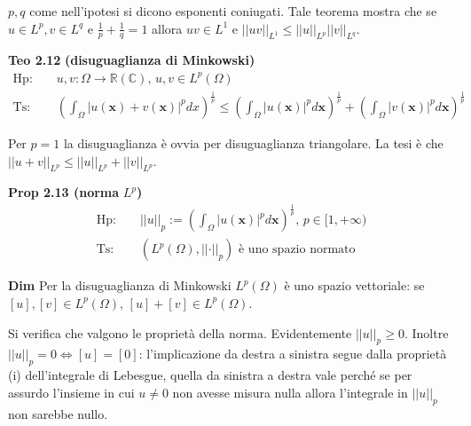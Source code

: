 \documentclass{article}
\begin{document}
$p,q$ come nell'ipotesi si dicono esponenti coniugati. Tale teorema mostra
che se $u\in L^{p},v\in L^{q}$ e $\frac{1}{p}+\frac{1}{q}=1$ allora $uv\in
L^{1}$ e $\left\vert \left\vert uv\right\vert \right\vert _{L^{1}}\leq
\left\vert \left\vert u\right\vert \right\vert _{L^{p}}\left\vert \left\vert
v\right\vert \right\vert _{L^{q}}$.

\textbf{Teo 2.12} \textbf{(disuguaglianza di Minkowski)}%
\begin{eqnarray*}
\text{Hp}\text{: } &&u,v:\Omega \rightarrow 
\mathbb{R}
\left( 
\mathbb{C}
\right) \text{, }u,v\in L^{p}\left( \Omega \right) \\
\text{Ts}\text{: } &&\left( \int_{\Omega }\left\vert u\left( \mathbf{x}%
\right) +v\left( \mathbf{x}\right) \right\vert ^{p}dx\right) ^{\frac{1}{p}%
}\leq \left( \int_{\Omega }\left\vert u\left( \mathbf{x}\right) \right\vert
^{p}d\mathbf{x}\right) ^{\frac{1}{p}}+\left( \int_{\Omega }\left\vert
v\left( \mathbf{x}\right) \right\vert ^{p}d\mathbf{x}\right) ^{\frac{1}{p}}
\end{eqnarray*}

Per $p=1$ la disuguaglianza \`{e} ovvia per disuguaglianza triangolare. La
tesi \`{e} che $\left\vert \left\vert u+v\right\vert \right\vert
_{L^{p}}\leq \left\vert \left\vert u\right\vert \right\vert
_{L^{p}}+\left\vert \left\vert v\right\vert \right\vert _{L^{p}}$.

\textbf{Prop 2.13 (norma }$L^{p}$\textbf{)} 
\begin{eqnarray*}
\text{Hp}\text{: } &&\left\vert \left\vert u\right\vert \right\vert
_{p}:=\left( \int_{\Omega }\left\vert u\left( \mathbf{x}\right) \right\vert
^{p}d\mathbf{x}\right) ^{\frac{1}{p}}\text{, }p\in \lbrack 1,+\infty ) \\
\text{Ts}\text{: } &&\left( L^{p}\left( \Omega \right) ,\left\vert
\left\vert \cdot \right\vert \right\vert _{p}\right) \text{ \`{e} uno spazio
normato }
\end{eqnarray*}

\textbf{Dim} Per la disuguaglianza di Minkowski $L^{p}\left( \Omega \right) $
\`{e} uno spazio vettoriale: se $\left[ u\right] ,\left[ v\right] \in
L^{p}\left( \Omega \right) $, $\left[ u\right] +\left[ v\right] \in
L^{p}\left( \Omega \right) $.

Si verifica che valgono le propriet\`{a} della norma. Evidentemente $%
\left\vert \left\vert u\right\vert \right\vert _{p}\geq 0$. Inoltre $%
\left\vert \left\vert u\right\vert \right\vert _{p}=0\Longleftrightarrow %
\left[ u\right] =\left[ 0\right] $: l'implicazione da destra a sinistra
segue dalla propriet\`{a} (i) dell'integrale di Lebesgue, quella da sinistra
a destra vale perch\'{e} se per assurdo l'insieme in cui $u\neq 0$ non
avesse misura nulla allora l'integrale in $\left\vert \left\vert
u\right\vert \right\vert _{p}$ non sarebbe nullo.
\end{document}

